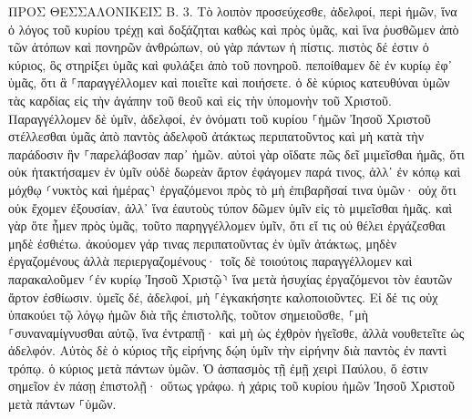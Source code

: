 \documentclass[twoside, 9pt]{extreport}
\begin{document}
ΠΡΟΣ ΘΕΣΣΑΛΟΝΙΚΕΙΣ Β.
3.
Τὸ λοιπὸν προσεύχεσθε, ἀδελφοί, περὶ ἡμῶν, ἵνα ὁ λόγος τοῦ κυρίου τρέχῃ καὶ δοξάζηται καθὼς καὶ πρὸς ὑμᾶς, 
καὶ ἵνα ῥυσθῶμεν ἀπὸ τῶν ἀτόπων καὶ πονηρῶν ἀνθρώπων, οὐ γὰρ πάντων ἡ πίστις. 
πιστὸς δέ ἐστιν ὁ κύριος, ὃς στηρίξει ὑμᾶς καὶ φυλάξει ἀπὸ τοῦ πονηροῦ. 
πεποίθαμεν δὲ ἐν κυρίῳ ἐφ᾽ ὑμᾶς, ὅτι ἃ ⸀παραγγέλλομεν καὶ ποιεῖτε καὶ ποιήσετε. 
ὁ δὲ κύριος κατευθύναι ὑμῶν τὰς καρδίας εἰς τὴν ἀγάπην τοῦ θεοῦ καὶ εἰς τὴν ὑπομονὴν τοῦ Χριστοῦ. 
Παραγγέλλομεν δὲ ὑμῖν, ἀδελφοί, ἐν ὀνόματι τοῦ κυρίου ⸀ἡμῶν Ἰησοῦ Χριστοῦ στέλλεσθαι ὑμᾶς ἀπὸ παντὸς ἀδελφοῦ ἀτάκτως περιπατοῦντος καὶ μὴ κατὰ τὴν παράδοσιν ἣν ⸀παρελάβοσαν παρ᾽ ἡμῶν. 
αὐτοὶ γὰρ οἴδατε πῶς δεῖ μιμεῖσθαι ἡμᾶς, ὅτι οὐκ ἠτακτήσαμεν ἐν ὑμῖν 
οὐδὲ δωρεὰν ἄρτον ἐφάγομεν παρά τινος, ἀλλ᾽ ἐν κόπῳ καὶ μόχθῳ ⸂νυκτὸς καὶ ἡμέρας⸃ ἐργαζόμενοι πρὸς τὸ μὴ ἐπιβαρῆσαί τινα ὑμῶν· 
οὐχ ὅτι οὐκ ἔχομεν ἐξουσίαν, ἀλλ᾽ ἵνα ἑαυτοὺς τύπον δῶμεν ὑμῖν εἰς τὸ μιμεῖσθαι ἡμᾶς. 
καὶ γὰρ ὅτε ἦμεν πρὸς ὑμᾶς, τοῦτο παρηγγέλλομεν ὑμῖν, ὅτι εἴ τις οὐ θέλει ἐργάζεσθαι μηδὲ ἐσθιέτω. 
ἀκούομεν γάρ τινας περιπατοῦντας ἐν ὑμῖν ἀτάκτως, μηδὲν ἐργαζομένους ἀλλὰ περιεργαζομένους· 
τοῖς δὲ τοιούτοις παραγγέλλομεν καὶ παρακαλοῦμεν ⸂ἐν κυρίῳ Ἰησοῦ Χριστῷ⸃ ἵνα μετὰ ἡσυχίας ἐργαζόμενοι τὸν ἑαυτῶν ἄρτον ἐσθίωσιν. 
ὑμεῖς δέ, ἀδελφοί, μὴ ⸀ἐγκακήσητε καλοποιοῦντες. 
Εἰ δέ τις οὐχ ὑπακούει τῷ λόγῳ ἡμῶν διὰ τῆς ἐπιστολῆς, τοῦτον σημειοῦσθε, ⸀μὴ ⸀συναναμίγνυσθαι αὐτῷ, ἵνα ἐντραπῇ· 
καὶ μὴ ὡς ἐχθρὸν ἡγεῖσθε, ἀλλὰ νουθετεῖτε ὡς ἀδελφόν. 
Αὐτὸς δὲ ὁ κύριος τῆς εἰρήνης δῴη ὑμῖν τὴν εἰρήνην διὰ παντὸς ἐν παντὶ τρόπῳ. ὁ κύριος μετὰ πάντων ὑμῶν. 
Ὁ ἀσπασμὸς τῇ ἐμῇ χειρὶ Παύλου, ὅ ἐστιν σημεῖον ἐν πάσῃ ἐπιστολῇ· οὕτως γράφω. 
ἡ χάρις τοῦ κυρίου ἡμῶν Ἰησοῦ Χριστοῦ μετὰ πάντων ⸀ὑμῶν. 
\end{document}
